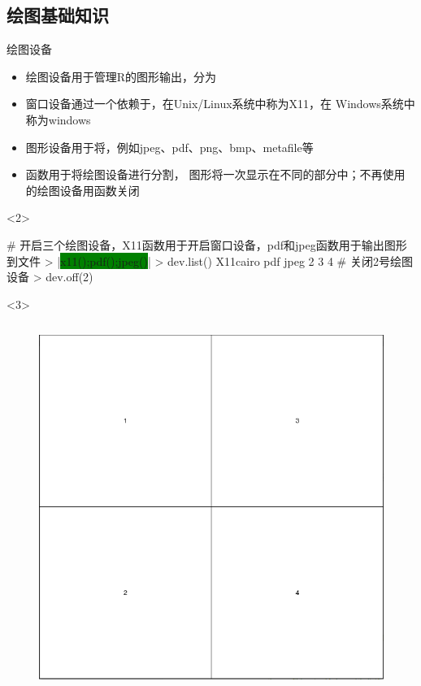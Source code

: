 \documentclass{beamerthemeMono}
\begin{document}
\subsection{绘图基础知识}
\begin{frame}[t, fragile]{\subsecname}{绘图设备}
  \begin{itemize}
  \item<1-> 绘图设备用于管理R的图形输出，分为
  \item<2-> 窗口设备通过一个依赖于，在Unix/Linux系统中称为X11，在
        Windows系统中称为windows
  \item<2-> 图形设备用于将，例如jpeg、pdf、png、bmp、metafile等
  \item<3-> 函数用于将绘图设备进行分割，
            图形将一次显示在不同的部分中；不再使用的绘图设备用函数关闭 
  \end{itemize} 

\begin{overlayarea}{\textwidth}{\textheight}
\begin{onlyenv}<2>
\begin{rcode}
# 开启三个绘图设备，X11函数用于开启窗口设备，pdf和jpeg函数用于输出图形到文件
> |\colorbox{green}{x11();pdf();jpeg()}|
> dev.list()
X11cairo      pdf     jpeg 
       2        3        4 
# 关闭2号绘图设备
> dev.off(2) 
\end{rcode}  
\end{onlyenv}

\begin{onlyenv}<3>
      \begin{columns}
        \begin{column}{.4\textwidth}
          \begin{figure}
            \centering
            \includegraphics[width=0.8\columnwidth]{layout.png}
          \end{figure}
        \end{column}


\end{columns}
\end{onlyenv}
\end{overlayarea}
\end{frame}
\end{document}
